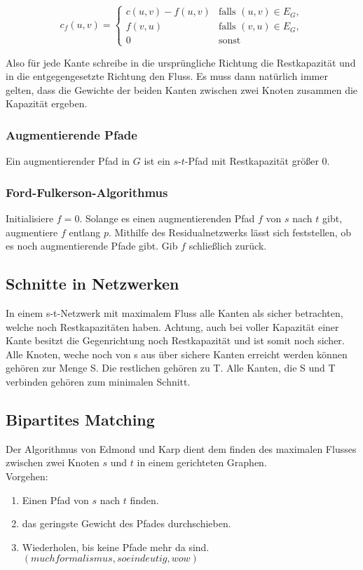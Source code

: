\documentclass[11pt]{scrartcl}
\begin{document}
$$c_f(u,v) = \begin{cases}
	c(u,v) - f(u,v) & \text{falls } (u,v) \in E_G, \\
    f(v,u) & \text{falls } (v,u) \in E_G, \\
    0 & \text{sonst}
\end{cases}$$

Also für jede Kante schreibe in die ursprüngliche Richtung die Restkapazität und in die entgegengesetzte Richtung den Fluss. Es muss dann natürlich immer gelten, dass die Gewichte der beiden Kanten zwischen zwei Knoten zusammen die Kapazität ergeben.

\subsubsection{Augmentierende Pfade}
Ein augmentierender Pfad in $G$ ist ein $s$-$t$-Pfad mit Restkapazität größer 0.

\subsubsection{Ford-Fulkerson-Algorithmus}
Initialisiere $f=0$. Solange es einen augmentierenden Pfad $f$ von $s$ nach $t$ gibt, augmentiere $f$ entlang $p$. Mithilfe des Residualnetzwerks lässt sich feststellen, ob es noch augmentierende Pfade gibt. Gib $f$ schließlich zurück.

\subsection{Schnitte in Netzwerken}

In einem s-t-Netzwerk mit maximalem Fluss alle Kanten als sicher betrachten, welche noch Restkapazitäten haben. Achtung, auch bei voller Kapazität einer Kante besitzt die Gegenrichtung noch Restkapazität und ist somit noch sicher. Alle Knoten, weche noch von s aus über sichere Kanten erreicht werden können gehören zur Menge S. Die restlichen gehören zu T. Alle Kanten, die S und T verbinden gehören zum minimalen Schnitt.

\subsection{Bipartites Matching}
Der Algorithmus von Edmond und Karp dient dem finden des maximalen Flusses zwischen zwei Knoten $s$ und $t$ in einem gerichteten Graphen. \\
Vorgehen:
\begin{enumerate}
\item Einen Pfad von $s$ nach $t$ finden.
\item das geringste Gewicht des Pfades durchschieben.
\item Wiederholen, bis keine Pfade mehr da sind. $(much formalismus, so eindeutig, wow)$
\end{enumerate}
\end{document}
